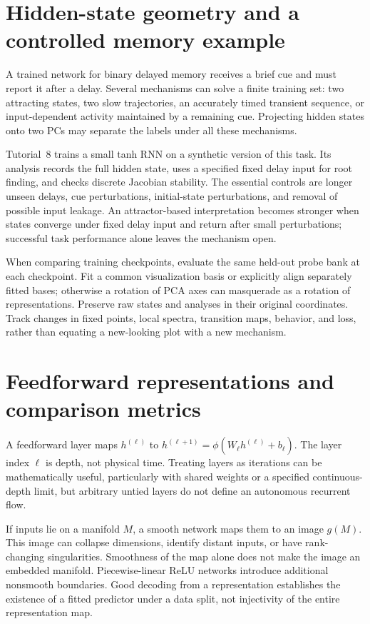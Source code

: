 \section{Hidden-state geometry and a controlled memory example}
A trained network for binary delayed memory receives a brief cue and must report it after a delay. Several mechanisms can solve a finite training set: two attracting states, two slow trajectories, an accurately timed transient sequence, or input-dependent activity maintained by a remaining cue. Projecting hidden states onto two PCs may separate the labels under all these mechanisms.

Tutorial~8 trains a small tanh RNN on a synthetic version of this task. Its analysis records the full hidden state, uses a specified fixed delay input for root finding, and checks discrete Jacobian stability. The essential controls are longer unseen delays, cue perturbations, initial-state perturbations, and removal of possible input leakage. An attractor-based interpretation becomes stronger when states converge under fixed delay input and return after small perturbations; successful task performance alone leaves the mechanism open.

When comparing training checkpoints, evaluate the same held-out probe bank at each checkpoint. Fit a common visualization basis or explicitly align separately fitted bases; otherwise a rotation of PCA axes can masquerade as a rotation of representations. Preserve raw states and analyses in their original coordinates. Track changes in fixed points, local spectra, transition maps, behavior, and loss, rather than equating a new-looking plot with a new mechanism.

\section{Feedforward representations and comparison metrics}
A feedforward layer maps $h^{(\ell)}$ to $h^{(\ell+1)}=\phi(W_\ell h^{(\ell)}+b_\ell)$. The layer index $\ell$ is depth, not physical time. Treating layers as iterations can be mathematically useful, particularly with shared weights or a specified continuous-depth limit, but arbitrary untied layers do not define an autonomous recurrent flow.

If inputs lie on a manifold $M$, a smooth network maps them to an image $g(M)$. This image can collapse dimensions, identify distant inputs, or have rank-changing singularities. Smoothness of the map alone does not make the image an embedded manifold. Piecewise-linear ReLU networks introduce additional nonsmooth boundaries. Good decoding from a representation establishes the existence of a fitted predictor under a data split, not injectivity of the entire representation map.

